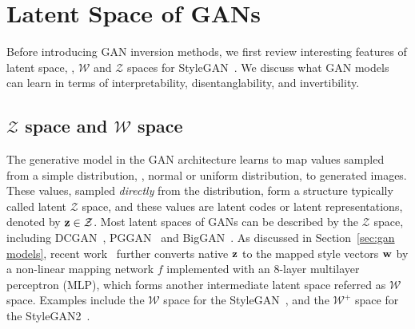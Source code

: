 \section{Latent Space of GANs}
\label{sec:feature}
Before introducing GAN inversion methods, we first review interesting features of latent space, \eg, $\mathcal{W}$ and $\mathcal{Z}$ spaces for StyleGAN~\cite{karras2019style}.
We discuss what GAN models can learn in terms of interpretability, disentanglability, and invertibility.


\subsection{$\mathcal{Z}$ space and $\mathcal{W}$ space}
\label{sec:space}

The generative model in the GAN architecture learns to map values sampled from a simple distribution, \eg, normal or uniform distribution, to generated images. 
These values, sampled \emph{directly} from the distribution, form a structure typically called latent $\mathcal{Z}$ space, and these values are latent codes or latent representations, denoted by $\mathbf{z} \in \mathcal{Z}$. 
Most latent spaces of GANs can be described by the $\mathcal{Z}$ space, including DCGAN~\cite{radford2016dcgan}, PGGAN~\cite{karras2017progressive} and BigGAN~\cite{brock2018large}.
As discussed in Section~\ref{sec:gan models}, recent work~\cite{karras2019style} further converts native $\mathbf{z}$ to the mapped style vectors $\mathbf{w}$ by a non-linear mapping network $f$ implemented with an $8$-layer multilayer perceptron (MLP), which forms another intermediate latent space referred as $\mathcal{W}$ space. 
Examples include the $\mathcal{W}$ space for the StyleGAN~\cite{karras2019style}, and the $\mathcal{W}^{+}$ space for the StyleGAN2~\cite{karras2020analyzing}.


